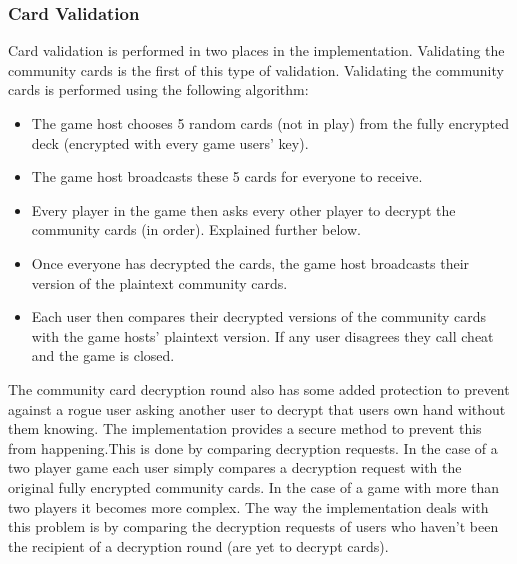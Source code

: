 \documentclass[11pt, oneside]{article}   	%
\begin{document}
\subsubsection{Card Validation}

Card validation is performed in two places in the implementation. Validating the community cards is the first of this type of validation. Validating the community cards is performed using the following algorithm:

\begin{itemize}
\renewcommand{\labelitemi}{$\bullet$}
\item The game host chooses 5 random cards (not in play) from the fully encrypted deck (encrypted with every game users’ key).
\item The game host broadcasts these 5 cards for everyone to receive.
\item Every player in the game then asks every other player to decrypt the community cards (in order). Explained further below.
\item Once everyone has decrypted the cards, the game host broadcasts their version of the plaintext community cards.
\item Each user then compares their decrypted versions of the community cards with the game hosts’ plaintext version. If any user disagrees they call cheat and the game is closed.
\end{itemize}

The community card decryption round also has some added protection to prevent against a rogue user asking another user to decrypt that users own hand without them knowing. The implementation provides a secure method to prevent this from happening.This is done by comparing decryption requests. In the case of a two player game each user simply compares a decryption request with the original fully encrypted community cards. In the case of a game with more than two players it becomes more complex. The way the implementation deals with this problem is by comparing the decryption requests of users who haven't been the recipient of a decryption round (are yet to decrypt cards).\\
\end{document}
